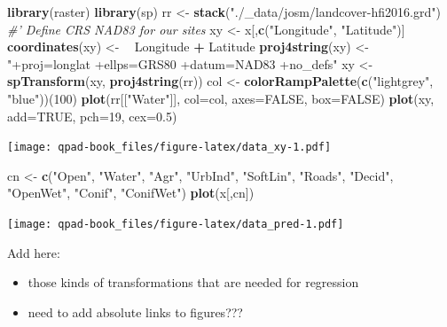 \documentclass[12pt,]{book}
\newenvironment{Shaded}{\begin{snugshade}}{\end{snugshade}}
\newcommand{\CommentTok}[1]{\textcolor[rgb]{0.56,0.35,0.01}{\textit{#1}}}
\newcommand{\DataTypeTok}[1]{\textcolor[rgb]{0.13,0.29,0.53}{#1}}
\newcommand{\DecValTok}[1]{\textcolor[rgb]{0.00,0.00,0.81}{#1}}
\newcommand{\ErrorTok}[1]{\textcolor[rgb]{0.64,0.00,0.00}{\textbf{#1}}}
\newcommand{\FloatTok}[1]{\textcolor[rgb]{0.00,0.00,0.81}{#1}}
\newcommand{\KeywordTok}[1]{\textcolor[rgb]{0.13,0.29,0.53}{\textbf{#1}}}
\newcommand{\NormalTok}[1]{#1}
\newcommand{\OperatorTok}[1]{\textcolor[rgb]{0.81,0.36,0.00}{\textbf{#1}}}
\newcommand{\OtherTok}[1]{\textcolor[rgb]{0.56,0.35,0.01}{#1}}
\newcommand{\StringTok}[1]{\textcolor[rgb]{0.31,0.60,0.02}{#1}}
\providecommand{\tightlist}{%
  \setlength{\itemsep}{0pt}\setlength{\parskip}{0pt}}
\begin{document}
\begin{Shaded}
\begin{Highlighting}[]
\KeywordTok{library}\NormalTok{(raster)}
\KeywordTok{library}\NormalTok{(sp)}
\NormalTok{rr <-}\StringTok{ }\KeywordTok{stack}\NormalTok{(}\StringTok{"./_data/josm/landcover-hfi2016.grd"}\NormalTok{)}
\CommentTok{#' Define CRS NAD83 for our sites}
\NormalTok{xy <-}\StringTok{ }\NormalTok{x[,}\KeywordTok{c}\NormalTok{(}\StringTok{"Longitude"}\NormalTok{, }\StringTok{"Latitude"}\NormalTok{)]}
\KeywordTok{coordinates}\NormalTok{(xy) <-}\StringTok{ }\ErrorTok{~}\StringTok{ }\NormalTok{Longitude }\OperatorTok{+}\StringTok{ }\NormalTok{Latitude}
\KeywordTok{proj4string}\NormalTok{(xy) <-}\StringTok{ "+proj=longlat +ellps=GRS80 +datum=NAD83 +no_defs"}
\NormalTok{xy <-}\StringTok{ }\KeywordTok{spTransform}\NormalTok{(xy, }\KeywordTok{proj4string}\NormalTok{(rr))}
\NormalTok{col <-}\StringTok{ }\KeywordTok{colorRampPalette}\NormalTok{(}\KeywordTok{c}\NormalTok{(}\StringTok{"lightgrey"}\NormalTok{, }\StringTok{"blue"}\NormalTok{))(}\DecValTok{100}\NormalTok{)}
\KeywordTok{plot}\NormalTok{(rr[[}\StringTok{"Water"}\NormalTok{]], }\DataTypeTok{col=}\NormalTok{col, }\DataTypeTok{axes=}\OtherTok{FALSE}\NormalTok{, }\DataTypeTok{box=}\OtherTok{FALSE}\NormalTok{)}
\KeywordTok{plot}\NormalTok{(xy, }\DataTypeTok{add=}\OtherTok{TRUE}\NormalTok{, }\DataTypeTok{pch=}\DecValTok{19}\NormalTok{, }\DataTypeTok{cex=}\FloatTok{0.5}\NormalTok{)}
\end{Highlighting}
\end{Shaded}

\texttt{[image: qpad-book\_files/figure-latex/data\_xy-1.pdf]}

\begin{Shaded}
\begin{Highlighting}[]
\NormalTok{cn <-}\StringTok{ }\KeywordTok{c}\NormalTok{(}\StringTok{"Open"}\NormalTok{, }\StringTok{"Water"}\NormalTok{, }\StringTok{"Agr"}\NormalTok{, }\StringTok{"UrbInd"}\NormalTok{, }\StringTok{"SoftLin"}\NormalTok{, }\StringTok{"Roads"}\NormalTok{, }
  \StringTok{"Decid"}\NormalTok{, }\StringTok{"OpenWet"}\NormalTok{, }\StringTok{"Conif"}\NormalTok{, }\StringTok{"ConifWet"}\NormalTok{)}
\KeywordTok{plot}\NormalTok{(x[,cn])}
\end{Highlighting}
\end{Shaded}

\texttt{[image: qpad-book\_files/figure-latex/data\_pred-1.pdf]}

Add here:

\begin{itemize}
\tightlist
\item
  those kinds of transformations that are needed for regression
\item
  need to add absolute links to figures???
\end{itemize}
\end{document}

